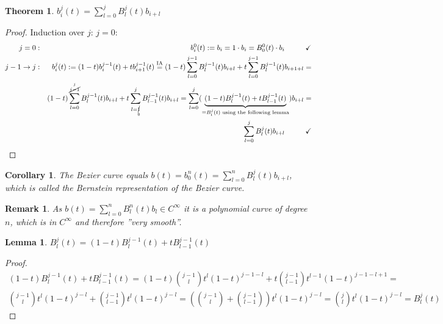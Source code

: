 \documentclass[]{article}
\newtheorem{lemma}{Lemma}
\newtheorem{theorem}{Theorem}
\newtheorem{remark}{Remark}
\newtheorem{corollary}{Corollary}
\begin{document}
\begin{theorem}
	$b_i^j(t) = \sum_{l=0}^{j} B_l^j(t) b_{i+l}$
\end{theorem}

\begin{proof}
	Induction over $j$: $j=0$:
	\begin{align*}
		j=0: && b_i^0(t):= b_i = 1 \cdot b_i = B_0^0(t) \cdot b_i \hspace{1cm} \checkmark\\
		j-1 \rightarrow j: && b_i^j(t) := (1-t)b_i^{j-1}(t) + t b_{i+1}^{j-1}(t) \overset{\mathrm{IA}}{=}
		(1-t) \sum_{l=0}^{j-1} B_l^{j-1}(t) b_{i+l} + t \sum_{l=0}^{j-1} B_l^{j-1}(t) b_{i+1+l} =\\
		&& (1-t) \sum_{l=0}^{\overset{j}{\cancel{j-1}}} B_l^{j-1}(t) b_{i+l} + t \sum_{l=\underset{0}{\cancel{1}}}^{j} B_{l-1}^{j-1}(t) b_{i+l} =
		\sum_{l=0}^{j} (\underbrace{(1-t) B_l^{j-1}(t) + t B_{l-1}^{j-1}(t)}_{=B_l^j(t) \text{ using the following lemma}}) b_{i+l} =\\
		&& \sum_{l=0}^{j} B_l^j(t) b_{i+l} \hspace{1cm} \checkmark
	\end{align*}
\end{proof}

\begin{corollary}
	The Bezier curve equals $b(t) = b_0^n(t) = \sum_{l=0}^{n} B_l^j(t) b_{i+l}$, which is called the Bernstein representation of the Bezier curve.
\end{corollary}

\begin{remark}
	As $b(t) = \sum_{l=0}^{n} B_l^n(t) b_l \in C^\infty$ it is a polynomial curve of degree $n$, which is in $C^\infty$ and therefore ''very smooth''.
\end{remark}

\begin{lemma}
	$B_l^j(t) = (1-t)B_l^{j-1}(t) + t B_{l-1}^{j-1}(t)$
\end{lemma}

\begin{proof}
	\begin{align*}
		(1-t)B_l^{j-1}(t) + t B_{l-1}^{j-1}(t) = (1-t) \binom{j-1}{l} t^l (1-t)^{j-1-l} + t \binom{j-1}{l-1} t^{l-1} (1-t)^{j-1-l+1} =\\
		\binom{j-1}{l} t^l (1-t)^{j-l} + \binom{j-1}{l-1} t^{l} (1-t)^{j-l} = \left(\binom{j-1}{l} + \binom{j-1}{l-1}\right) t^l (1-t)^{j-l} = \binom{j}{l} t^l (1-t)^{j-l} = B_l^j(t)
	\end{align*}
\end{proof}
\end{document}
